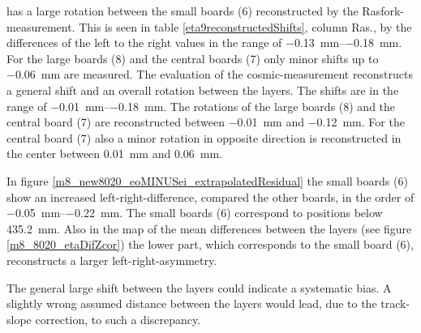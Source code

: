 \documentclass[
twoside,            %
BCOR1.4cm,          %
10pt,               %
headings=normal,    %
headsepline,        %
clearplainpage,		%
final,              %
div=14,
open=right,
bibliography=toc
]{scrreprt}
\begin{document}
has a large rotation between the small boards (6) reconstructed by the Rasfork-measurement. 
This is seen in table \ref{eta9reconstructedShifts}, column Ras., by the differences of the left to the right values in the range of \SIrange{-0.13}{-0.18}{mm}.
For the large boards (8) and the central boards (7) only minor shifts up to \SI{-0.06}{mm} are measured.
The evaluation of the cosmic-measurement reconstructs a general shift and an overall rotation between the layers.
The shifts are in the range of \SIrange{-0.01}{-0.18}{mm}.
The rotations of the large boards (8) and the central board (7) are reconstructed between \SI{-0.01}{mm} and \SI{-0.12}{mm}.
For the central board (7) also a minor rotation in opposite direction is reconstructed in the center between \SI{0.01}{mm} and \SI{0.06}{mm}.

In figure \ref{m8_new8020_eoMINUSei_extrapolatedResidual} the small boards (6) show an increased left-right-difference, compared the other boards, in the order of \SIrange{-0.05}{-0.22}{mm}.
The small boards (6) correspond to positions below \SI{435.2}{mm}.
Also in the map of the mean differences between the layers (see figure \ref{m8_8020_etaDifZcor}) the lower part, which corresponds to the small board (6), reconstructs a larger left-right-asymmetry.

The general large shift between the layers could indicate a systematic bias.
A slightly wrong assumed distance between the layers would lead, due to the track-slope correction, to such a discrepancy.
\end{document}
